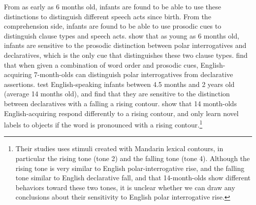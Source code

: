 From as early as 6 months old, infants are found to be able to use these distinctions to distinguish different speech acts since birth. From the comprehension side, infants are found to be able to use prosodic cues to distinguish clause types and speech acts. \textcite{frota2014} show that as young as 6 months old, infants are sensitive to the prosodic distinction between polar interrogatives and declaratives, which is the only cue that distinguishes these two clause types. \textcite{geffenmintz2011} find that when given a combination of word order and prosodic cues, English-acquiring 7-month-olds can distinguish polar interrogatives from declarative assertions. \textcite{soderstrom2005clause} test English-speaking infants between 4.5 months and 2 years old (average 14 months old), and find that they are sensitive to the distinction between declaratives with a falling a rising contour. \textcite{} show that 14 month-olds English-acquiring respond differently to a rising contour, and only learn novel labels to objects if the word is pronounced with a rising contour.\footnote{Their studies uses stimuli created with Mandarin lexical contours, in particular the rising tone (tone 2) and the falling tone (tone 4). Although the rising tone is very similar to English polar-interrogative rise, and the falling tone similar to English declarative fall, and that 14-month-olds show different behaviors toward these two tones, it is unclear whether we can draw any conclusions about their sensitivity to English polar interrogative rise.}


